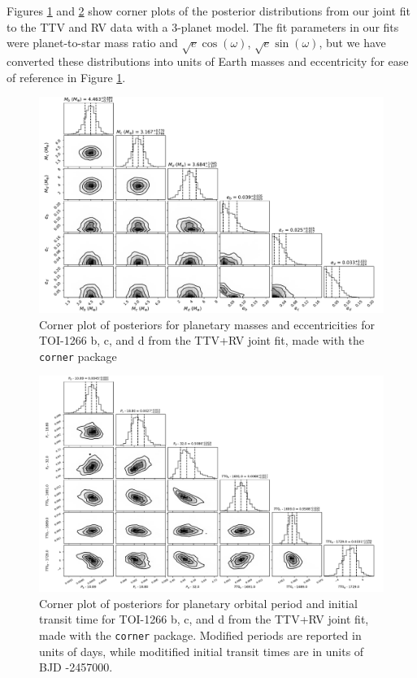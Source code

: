 \documentclass[twocolumn]{aastex631}
\begin{document}
Figures \ref{fig:Joint_MassEcc_Corner} and \ref{fig:Joint_Ephem_Corner} show corner plots of the posterior distributions from our joint fit to the TTV and RV data with a 3-planet model. The fit parameters in our fits were planet-to-star mass ratio and $\sqrt{e}\cos(\omega)$, $\sqrt{e}\sin(\omega)$, but we have converted these distributions into units of Earth masses and eccentricity for ease of reference in Figure \ref{fig:Joint_MassEcc_Corner}.

\begin{figure}
\begin{center}
  \includegraphics[width=15.5cm]{MassEccCorner_Joint.pdf}
  \caption{Corner plot of posteriors for planetary masses and eccentricities for TOI-1266 b, c, and d from the TTV+RV joint fit, made with the \texttt{corner} package \citep{corner}}
  \label{fig:Joint_MassEcc_Corner}
\end{center}
\end{figure}

\begin{figure}
\begin{center}
  \includegraphics[width=\textwidth]{EphemCorner_Joint.pdf}
  \caption{Corner plot of posteriors for planetary orbital period and initial transit time for TOI-1266 b, c, and d from the TTV+RV joint fit, made with the \texttt{corner} package. Modified periods are reported in units of days, while moditified initial transit times are in units of BJD -2457000.}
  \label{fig:Joint_Ephem_Corner}
\end{center}
\end{figure}
\end{document}
